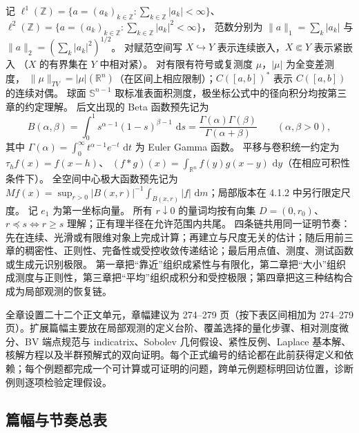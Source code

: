 \documentclass[11pt,a4paper]{ctexart}
\newcommand{\R}{\mathbb R}
\newcommand{\dd}{\,\mathrm d}
\begin{document}
记
$\ell^1(\mathbb Z)=\{a=(a_k)_{k\in\mathbb Z}:\sum_{k\in\mathbb Z}|a_k|<\infty\}$、
$\ell^2(\mathbb Z)=\{a=(a_k)_{k\in\mathbb Z}:\sum_{k\in\mathbb Z}|a_k|^2<\infty\}$，
范数分别为 $\|a\|_1=\sum_k|a_k|$ 与
$\|a\|_2=(\sum_k|a_k|^2)^{1/2}$。
对赋范空间写 $X\hookrightarrow Y$ 表示连续嵌入，$X\Subset Y$ 表示紧嵌入
（$X$ 的有界集在 $Y$ 中相对紧）。
对有限有符号或复测度 $\mu$，$|\mu|$ 为全变差测度，
$\|\mu\|_{TV}=|\mu|(\mathbb R^n)$（在区间上相应限制）；$C([a,b])^*$ 表示
$C([a,b])$ 的连续对偶。
球面 $\mathbb S^{n-1}$ 取标准表面积测度，极坐标公式中的径向积分均按第三章的约定理解。
后文出现的 Beta 函数预先记为
\[
B(\alpha,\beta)=\int_0^1s^{\alpha-1}(1-s)^{\beta-1}\,\dd s
 =\frac{\Gamma(\alpha)\Gamma(\beta)}{\Gamma(\alpha+\beta)}
 \qquad(\alpha,\beta>0),
\]
其中 $\Gamma(\alpha)=\int_0^\infty t^{\alpha-1}e^{-t}\,\dd t$ 为 Euler Gamma 函数。
平移与卷积统一约定为
$\tau_hf(x)=f(x-h)$、
$(f*g)(x)=\int_{\R^n}f(y)g(x-y)\,\dd y$（在相应可积性条件下）。
全空间中心极大函数预先记为
$Mf(x)=\sup_{r>0}|B(x,r)|^{-1}\int_{B(x,r)}|f|\,\dd m$；局部版本在 4.1.2 中另行限定尺度。
记 $e_1$ 为第一坐标向量。
所有 $r\downarrow0$ 的量词均按有向集
$D=(0,r_0)$、$r\preceq s\Longleftrightarrow r\ge s$ 理解；正有理半径在允许范围内共尾。
四条链共用同一证明节奏：先在连续、光滑或有限维对象上完成计算；再建立与尺度无关的估计；随后用前三章的稠密性、正则性、完备性或受控收敛传递结论；最后用点值、测度、测试函数或生成元识别极限。
第一章把“靠近”组织成紧性与有限化，第二章把“大小”组织成测度与正则性，第三章把“平均”组织成积分和受控极限；第四章把这三种结构合成为局部观测的恢复链。

全章设置二十二个正文单元，章幅建议为 274--279 页（按下表区间相加为 274--279 页）。扩展篇幅主要放在局部观测的定义台阶、覆盖选择的量化步骤、相对测度微分、BV 端点规范与 indicatrix、Sobolev 几何假设、紧性反例、Laplace 基本解、核解方程以及半群预解式的双向证明。每个正式编号的结论都在此前获得定义和依赖；每个例题都完成一个可计算或可证明的问题，跨单元例题标明回访位置，诊断例则逐项检验定理假设。

\subsection{篇幅与节奏总表}
\end{document}
